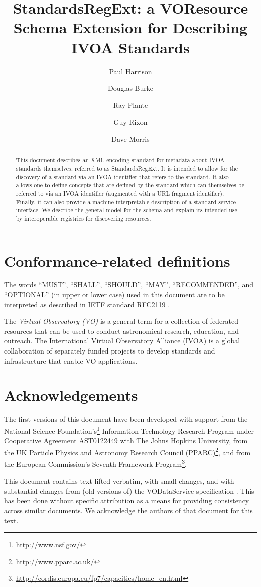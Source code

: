 \documentclass[11pt,a4paper]{ivoa}
\author[http://www.ivoa.net/twiki/bin/view/IVOA/PaulHarrison]{Paul Harrison}
\author[http://www.ivoa.net/twiki/bin/view/IVOA/DougBurke]{Douglas Burke}
\author[http://www.ivoa.net/twiki/bin/view/IVOA/RayPlante]{Ray Plante}
\author[http://www.ivoa.net/twiki/bin/view/IVOA/GuyRixon]{Guy Rixon}
\author[http://www.ivoa.net/twiki/bin/view/IVOA/DaveMorris]{Dave Morris}
\title{StandardsRegExt: a VOResource Schema Extension for Describing
IVOA Standards}
\begin{document}
\begin{abstract}
This document describes an XML encoding standard for metadata about
IVOA standards themselves, referred to as StandardsRegExt.  It is intended
to allow for the discovery of a standard via an IVOA identifier that
refers to the standard.  It also allows one to define concepts that
are defined by the standard which can themselves be referred to via an
IVOA identifier (augmented with a URL fragment identifier).  Finally,
it can also provide a machine interpretable description of a standard
service interface.  We describe the general model for the schema and
explain its intended use by interoperable registries for discovering
resources.
\end{abstract}


\section*{Conformance-related definitions}

The words ``MUST'', ``SHALL'', ``SHOULD'', ``MAY'', ``RECOMMENDED'', and
``OPTIONAL'' (in upper or lower case) used in this document are to be
interpreted as described in IETF standard RFC2119 \citep{std:RFC2119}.

The \emph{Virtual Observatory (VO)} is a
general term for a collection of federated resources that can be used
to conduct astronomical research, education, and outreach.
The \href{https://www.ivoa.net}{International
Virtual Observatory Alliance (IVOA)} is a global
collaboration of separately funded projects to develop standards and
infrastructure that enable VO applications.

\section*{Acknowledgements}

The first versions of this document have been developed with support from the
National Science Foundation's\footnote{\url{http://www.nsf.gov/}}
Information Technology Research Program under Cooperative Agreement
AST0122449 with The Johns Hopkins University, from the
UK Particle Physics and Astronomy Research Council
(PPARC)\footnote{\url{http://www.pparc.ac.uk/}}, and from the
European Commission's Seventh Framework
Program\footnote{\url{http://cordis.europa.eu/fp7/capacities/home_en.html}}.

This document contains text lifted verbatim, with small changes, and
with substantial changes from (old versions of) the VODataService
specification \citep{2021ivoa.spec.1102D}.  This
has been done without specific attribution as a means for providing
consistency across similar documents.  We acknowledge the authors of
that document for this text.  
\end{document}
